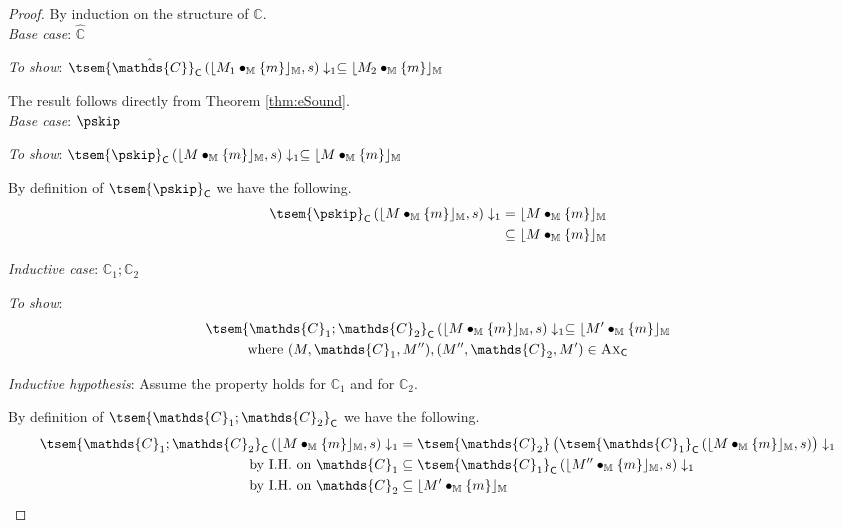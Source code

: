 {\parindent0pt
\begin{proof}
By induction on the structure of $\mathds{C}$. \\

\textit{Base case}: $\mathds{\hat{C}}$

\textit{To show}: $\tsem{\hat{\mathds{C}}}_\mathsf{C} \left( \lfloor M_1 \bullet_\mathbb{M} \{m\} \rfloor_\mathbb{M}, s \right) \downarrow_1 \subseteq \lfloor M_2 \bullet_\mathbb{M} \{m\} \rfloor_\mathbb{M}$

The result follows directly from Theorem \ref{thm:eSound}. \\

\textit{Base case}: $\pskip$

\textit{To show}: $\tsem{\pskip}_\mathsf{C} \left( \lfloor M \bullet_\mathbb{M} \{m\} \rfloor_\mathbb{M}, s \right) \downarrow_1 \subseteq \lfloor M \bullet_\mathbb{M} \{m\} \rfloor_\mathbb{M}$

By definition of $\tsem{\pskip}_\mathsf{C}$ we have the following.
\begin{align*}
	\tsem{\pskip}_\mathsf{C} \left( \lfloor M \bullet_\mathbb{M} \{m\} \rfloor_\mathbb{M}, s \right) \downarrow_1
	&=
	\lfloor M \bullet_\mathbb{M} \{m\} \rfloor_\mathbb{M}
	\\
	&\subseteq \lfloor M \bullet_\mathbb{M} \{m\} \rfloor_\mathbb{M}
\end{align*} 

\textit{Inductive case}: $\mathds{C}_1 ; \mathds{C}_2$

\textit{To show}:
\begin{gather*}
	\tsem{\mathds{C}_1 ; \mathds{C}_2}_\mathsf{C} \left( \lfloor M \bullet_\mathbb{M} \{m\} \rfloor_\mathbb{M}, s \right) \downarrow_1 \subseteq \lfloor M' \bullet_\mathbb{M} \{m\} \rfloor_\mathbb{M}
	\\
	\text{where } (M, \mathds{C}_1, M''), (M'', \mathds{C}_2, M') \in \textsc{Ax}_\mathsf{C}
\end{gather*}

\textit{Inductive hypothesis}: Assume the property holds for $\mathds{C}_1$ and for $\mathds{C}_2$.

By definition of $\tsem{\mathds{C}_1 ; \mathds{C}_2}_\mathsf{C}$ we have the following.
\begin{align*}
	\tsem{\mathds{C}_1 ; \mathds{C}_2}_\mathsf{C} \left( \lfloor M \bullet_\mathbb{M} \{m\} \rfloor_\mathbb{M}, s \right) \downarrow_1
	&=
	\tsem{\mathds{C}_2}\left( \tsem{\mathds{C}_1}_\mathsf{C} \left( \lfloor M \bullet_\mathbb{M} \{m\}\rfloor_\mathbb{M}, s \right) \right) \downarrow_1 \\
	\text{by I.H. on } \mathds{C}_1 &\subseteq
	\tsem{\mathds{C}_1}_\mathsf{C} \left( \lfloor M'' \bullet_\mathbb{M} \{m\} \rfloor_\mathbb{M}, s \right) \downarrow_1 \\
	\text{by I.H. on } \mathds{C}_2 &\subseteq
	\lfloor M' \bullet_\mathbb{M} \{m\} \rfloor_\mathbb{M}
\end{align*}


\end{proof}}
